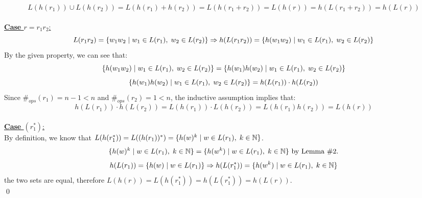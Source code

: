 \documentclass[11pt]{article}
\begin{document}
\[L(h(r_1))\cup L(h(r_2))=L(h(r_1)+h(r_2))=L(h(r_1+r_2))=L(h(r))=h(L(r_1+r_2))=h(L(r))\]
\\
\underline{\textbf{Case $r=r_1r_2$}:}
\[L(r_1r_2)=\{w_1w_2\hspace{1mm}|\hspace{1mm}w_1\in L(r_1),\hspace{1mm}w_2\in L(r_2)\}\Rightarrow h(L(r_1r_2))=\{h(w_1w_2)\hspace{1mm}|\hspace{1mm}w_1\in L(r_1),\hspace{1mm}w_2\in L(r_2)\}\]
By the given property, we can see that:
\[\{h(w_1w_2)\hspace{1mm}|\hspace{1mm}w_1\in L(r_1),\hspace{1mm}w_2\in L(r_2)\}=\{h(w_1)h(w_2)\hspace{1mm}|\hspace{1mm}w_1\in L(r_1),\hspace{1mm}w_2\in L(r_2)\}\]
\[\{h(w_1)h(w_2)\hspace{1mm}|\hspace{1mm}w_1\in L(r_1),\hspace{1mm}w_2\in L(r_2)\}=h(L(r_1))\cdot h(L(r_2))\]
Since $\#_{ops}(r_1)=n-1<n$ and $\#_{ops}(r_2)=1<n$, the inductive assumption implies that:
\[h(L(r_1))\cdot h(L(r_2))=L(h(r_1))\cdot L(h(r_2))=L(h(r_1)h(r_2))=L(h(r))\]
\\
\underline{\textbf{Case $(r_1^*)$}:} \\
By definition, we know that $L(h(r_1^*))=L((h(r_1))^*)=\{h(w)^k\hspace{1mm}|\hspace{1mm}w\in L(r_1),\hspace{1mm}k\in\mathbb{N}\}$.
\[\{h(w)^k\hspace{1mm}|\hspace{1mm}w\in L(r_1),\hspace{1mm}k\in\mathbb{N}\}=\{h(w^k)\hspace{1mm}|\hspace{1mm}w\in L(r_1),\hspace{1mm}k\in\mathbb{N}\}\text{ by Lemma }\#2.\]
\[h(L(r_1))=\{h(w)\hspace{1mm}|\hspace{1mm}w\in L(r_1)\}\Rightarrow h(L(r_1^*))=\{h(w^k)\hspace{1mm}|\hspace{1mm}w\in L(r_1),\hspace{1mm}k\in\mathbb{N}\}\]
the two sets are equal, therefore $L(h(r))=L(h(r_1^*))=h(L(r_1^*))=h(L(r))$. \\ \qed
\end{document}
